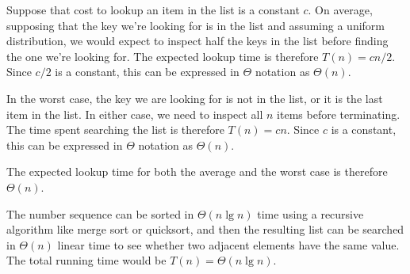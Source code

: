 \documentclass[a4paper,12pt]{article}
\begin{document}
\vspace{5mm}

Suppose that cost to lookup an item in the list is a constant $c$. On average, supposing that the key we're looking for is in the list and
assuming a uniform distribution, we would expect to 
inspect half the keys in the list before finding the one we're looking for. The expected lookup time is therefore $T(n) = cn/2$. Since $c/2$ is a 
constant, this can be expressed in $\Theta$ notation as $\Theta(n)$.

In the worst case, the key we are looking for is not in the list, or it is the last item in the list. In either case, we need to inspect all $n$ items 
before terminating. The time spent searching the list is therefore $T(n) = cn$. Since $c$ is a constant, this can be expressed in $\Theta$ notation as $\Theta(n)$.

The expected lookup time for both the average and the worst case is therefore $\Theta(n)$.

\vspace{5mm}


The number sequence can be sorted in $\Theta(n \lg n)$ time using a recursive algorithm like merge sort or quicksort, and then the resulting list can be 
searched in $\Theta(n)$ linear time to see whether two adjacent elements have the same value. The total running time would be $T(n) = \Theta(n \lg n)$.
\end{document}
